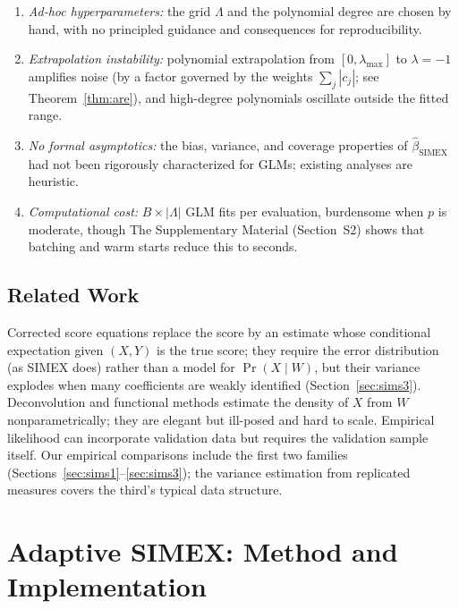 \documentclass[3p,11pt]{elsarticle}
\theoremstyle{plain}
\theoremstyle{definition}
\begin{document}
\begin{enumerate}\itemsep2pt
\item \emph{Ad-hoc hyperparameters:} the grid $\Lambda$ and the
      polynomial degree are chosen by hand, with no principled
      guidance and consequences for reproducibility.
\item \emph{Extrapolation instability:} polynomial extrapolation from
      $[0,\lambda_{\max}]$ to $\lambda=-1$ amplifies noise (by a
      factor governed by the weights $\sum_j|c_j|$; see
      Theorem~\ref{thm:are}), and high-degree polynomials oscillate
      outside the fitted range.
\item \emph{No formal asymptotics:} the bias, variance, and coverage
      properties of $\hat\beta_{\mathrm{SIMEX}}$ had not been
      rigorously characterized for GLMs; existing analyses are
      heuristic.
\item \emph{Computational cost:} $B\times|\Lambda|$ GLM fits per
      evaluation, burdensome when $p$ is moderate, though
      The Supplementary Material (Section~S2) shows that batching and warm
      starts reduce this to seconds.
\end{enumerate}

\subsection{Related Work}\label{sec:related}

Corrected score equations \citep{nakamura1990} replace the score by an
estimate whose conditional expectation given $(X,Y)$ is the true
score; they require the error distribution (as SIMEX does) rather than
a model for $\Pr(X\mid W)$, but their variance explodes when many
coefficients are weakly identified (Section~\ref{sec:sims3}).
Deconvolution and functional methods \citep{fan1993,delaigle2008}
estimate the density of $X$ from $W$ nonparametrically; they are
elegant but ill-posed and hard to scale. Empirical likelihood
\citep{qin2000} can incorporate validation data but requires the
validation sample itself. Our empirical comparisons include the first
two families (Sections~\ref{sec:sims1}--\ref{sec:sims3}); the variance
estimation from replicated measures covers the third's typical data
structure.

\section{Adaptive SIMEX: Method and Implementation}\label{sec:method}
\end{document}
